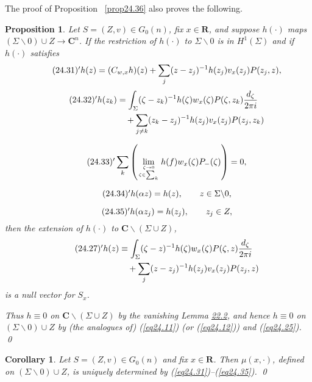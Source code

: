 \documentclass{surv-l}
\theoremstyle{plain}
\newtheorem{cor}[theorem]{Corollary}
\newtheorem{prop}[theorem]{Proposition}
\theoremstyle{definition}
\numberwithin{equation}{chapter}
\begin{document}
The proof of Proposition ~\ref{prop24.36} also proves the following.
\setcounter{theorem}{37}
\begin{prop}\label{prop24.38}
Let $S=(Z, v)\in G_{0}(n)$, fix $x\in \mathbf{R}$, and suppose $h(\cdot)$ maps $(\Sigma\backslash 0)\cup Z\rightarrow \mathbf{C}^{n}$. If the restriction of $h(\cdot)$ to $\Sigma\backslash 0$ is in $H^{1}(\Sigma)$ and if $h(\cdot)$ satisfies
\begin{equation*}
\tag*{$(24.31)^{\prime}$} h(z)=(C_{w,x}h)(z)+\sum_{j}(z-z_{j})^{-1}h(z_{j})v_{x}(z_{j})P(z_{j},z),
\end{equation*}
\begin{align*}
\tag*{$(24.32)^{\prime}$} h(z_{k})&=\int_{\Sigma}(\zeta-z_{k})^{-1}h(\zeta)w_{x}(\zeta)P(\zeta, z_{k})\frac{d_{\zeta}}{2\pi i}\\
&\quad+\sum_{j\neq k}(z_{k}-z_{j})^{-1}h(z_{j})v_{x}(z_{j})P(z_{j}, z_{k})\nonumber
\end{align*}

\begin{equation*}
\tag*{$(24.33)^{\prime}$} \sum_{k}\left(\lim_{{\zeta\rightarrow 0}\atop{\zeta \in \sum_{k}}} h(f)w_{x}(\zeta)P_{-}(\zeta)\right)=0,
\end{equation*}

\begin{equation*}
\tag*{$(24.34)^{\prime}$}  h(\alpha z)=h(z),\qquad z\in\Sigma\backslash 0,
\end{equation*}

\begin{equation*}
\tag*{$(24.35)^{\prime}$}  h(\alpha z_{j})=h(z_{j}),\qquad z_{j}\in Z,
\end{equation*}
then the extension of $h(\cdot)$ to $\mathbf{C}\backslash (\Sigma\cup Z)$,
\begin{align*}
\tag*{$(24.27)^{\prime}$}   h(z)& \equiv\int_{\Sigma}(\zeta -z)^{-1}h(\zeta)w_{x}(\zeta)P(\zeta,z)\frac{d_{\zeta}}{2\pi i}\\
& \quad +\sum_{j}(z-z_{j})^{-1}h(z_{j})v_{x}(z_{j})P(z_{j}, z) \nonumber
\end{align*}
is a null vector for $S_{x}$.

Thus $h\equiv 0$ on $\mathbf{C}\backslash (\Sigma\cup Z)$ by the
vanishing Lemma \hyperref[lem22.2]{22.2}, and hence $h\equiv 0$ on $(\Sigma\backslash
0)\cup Z$ by (the analogues of) \emph{(\ref{eq24.11})} \emph{(or
(\ref{eq24.12}))} and \emph{(\ref{eq24.25})}. \qed
\end{prop}

\setcounter{theorem}{38}
\begin{cor}\label{coro24.39}
Let $S=(Z, v)\in G_{0}(n)$ and fix $x\in \mathbf{R}$. Then $\mu(x,
\cdot)$, defined on $(\Sigma\backslash 0)\cup Z$, is uniquely
determined by \emph{(\ref{eq24.31})}--\emph{(\ref{eq24.35})}. \qed
\end{cor}
\end{document}
